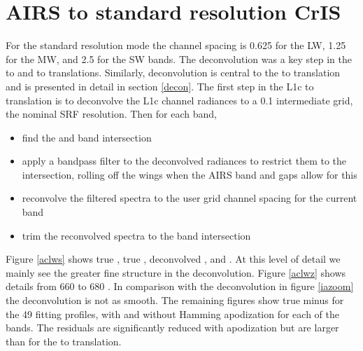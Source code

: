 \documentclass[12pt]{article}
\begin{document}
\FloatBarrier

\section{AIRS to standard resolution CrIS}
\label{airs2cris}

For the {\cris} standard resolution mode the channel spacing is
0.625 {\wn} for the LW, 1.25 {\wn} for the MW, and 2.5 {\wn} for the
SW bands.  The {\iasi} deconvolution was a key step in the {\iasi}
to {\cris} and {\iasi} to {\airs} translations.  Similarly, {\airs}
deconvolution is central to the {\airs} to {\cris} translation and
is presented in detail in section \ref{decon}.  The first step in
the {\airs} L1c to {\cris} translation is to deconvolve the {\airs}
L1c channel radiances to a 0.1 {\wn} intermediate grid, the nominal
{\airs} SRF resolution.  Then for each {\cris} band,

\begin{itemize}
  \item find the {\airs} and {\cris} band intersection

  \item apply a bandpass filter to the deconvolved {\airs} radiances
    to restrict them to the intersection, rolling off the wings when
    the AIRS band and gaps allow for this

  \item reconvolve the filtered spectra to the user grid channel
    spacing for the current {\cris} band

  \item trim the reconvolved spectra to the band intersection 
\end{itemize}

Figure \ref{aclws} shows true {\cris}, true {\airs}, deconvolved
{\airs}, and {\airs} {\cris}.  At this level of detail we mainly see
the greater fine structure in the deconvolution.  Figure \ref{aclwz}
shows details from 660 to 680 {\wn}.  In comparison with the {\iasi}
deconvolution in figure \ref{iazoom} the {\airs} deconvolution is
not as smooth.  The remaining figures show true {\cris} minus
{\airs} {\cris} for the 49 fitting profiles, with and without
Hamming apodization for each of the {\cris} bands.  The residuals
are significantly reduced with apodization but are larger than for
the {\iasi} to {\cris} translation.
\end{document}
